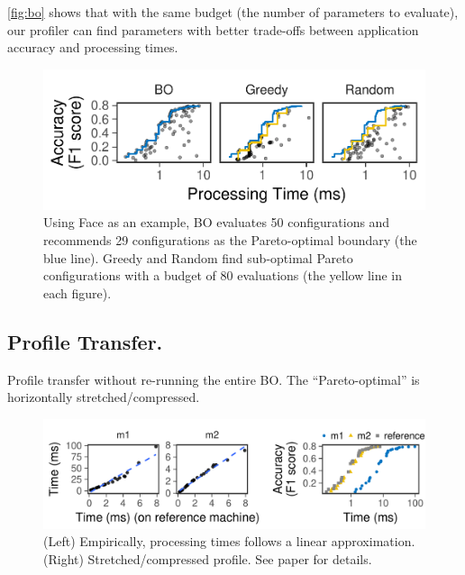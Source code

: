 \autoref{fig:bo} shows that with the same budget (the number of parameters to
evaluate), our profiler can find parameters with better trade-offs between
application accuracy and processing times.

\begin{figure}
  \centering
  \includegraphics[width=0.95\columnwidth]{figures/profiling.pdf}
  \caption{Using Face as an example, BO evaluates 50 configurations and
    recommends 29 configurations as the Pareto-optimal boundary (the blue
    line). Greedy and Random find sub-optimal Pareto configurations with a
    budget of 80 evaluations (the yellow line in each figure).}
  \label{fig:bo}
\end{figure}

\subsection{Profile Transfer.}

Profile transfer without re-running the entire BO. The ``Pareto-optimal'' is
horizontally stretched/compressed.

\begin{figure}
  \centering
  \includegraphics[width=0.95\linewidth]{figures/serving-cross-platform.pdf}
  \caption{(Left) Empirically, processing times follows a linear
    approximation. (Right) Stretched/compressed profile. See paper for
    details.}
\end{figure}

